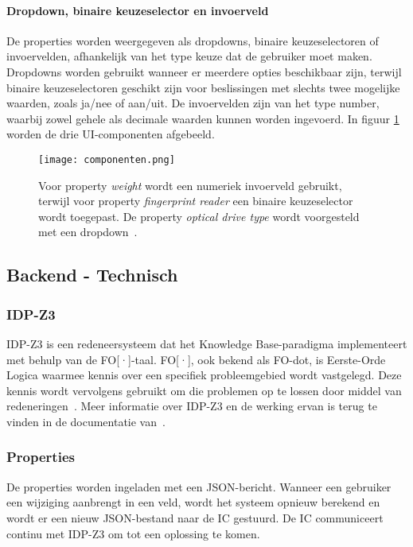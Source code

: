 \paragraph{Dropdown, binaire keuzeselector en invoerveld}
De properties worden weergegeven als dropdowns, binaire keuzeselectoren of invoervelden, afhankelijk van het type keuze dat de gebruiker moet maken. Dropdowns worden gebruikt wanneer er meerdere opties beschikbaar zijn, terwijl binaire keuzeselectoren geschikt zijn voor beslissingen met slechts twee mogelijke waarden, zoals ja/nee of aan/uit. De invoervelden zijn van het type number, waarbij zowel gehele als decimale waarden kunnen worden ingevoerd. In figuur \ref{fig:componenten} worden de drie UI-componenten afgebeeld.

\begin{figure}
    \centering
    \texttt{[image: componenten.png]}
    \caption[Dropdown, binaire keuzeselector en invoerveld]{\label{fig:componenten}Voor property \textit{weight} wordt  een numeriek invoerveld gebruikt, terwijl voor property \textit{fingerprint reader} een binaire keuzeselector wordt toegepast. De property \textit{optical drive type} wordt voorgesteld met een dropdown~\autocite{KULeuven}.}
\end{figure}

\subsection{Backend - Technisch}
\subsubsection{IDP-Z3}
IDP-Z3 is een redeneersysteem dat het Knowledge Base-paradigma implementeert met behulp van de FO[·]-taal. FO[·], ook bekend als FO-dot, is Eerste-Orde Logica waarmee kennis over een specifiek probleemgebied wordt vastgelegd. Deze kennis wordt vervolgens gebruikt om die problemen op te lossen door middel van redeneringen~\autocite{Carbonnelle2024}. Meer informatie over IDP-Z3 en de werking ervan is terug te vinden in de documentatie van~\textcite{Carbonnelle2024}.

\subsubsection{Properties}
De properties worden ingeladen met een JSON-bericht. Wanneer een gebruiker een wijziging aanbrengt in een veld, wordt het systeem opnieuw berekend en wo\-rdt er een nieuw JSON-bestand naar de IC gestuurd. De IC communiceert continu met IDP-Z3 om tot een oplossing te komen.

